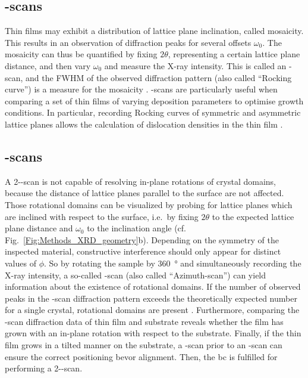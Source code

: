 \subsection{\textomega-scans}
    \label{Sec:Methods_omegaScan}
Thin films may exhibit a distribution of lattice plane inclination, called mosaicity.
This results in an observation of diffraction peaks for several offsets $\omega_0$.
The mosaicity can thus be quantified by fixing $2\theta$, representing a certain lattice plane distance, and then vary $\omega_0$ and measure the X-ray intensity.
This is called an \textomega-scan, and the \gls{FWHM} of the observed diffraction pattern (also called \enquote{Rocking curve}) is a measure for the mosaicity
    \cite{harrington2021}.
\textomega-scans are particularly useful when comparing a set of thin films of varying deposition parameters to optimise growth conditions.
In particular, recording Rocking curves of symmetric and asymmetric lattice planes allows the calculation of dislocation densities in the thin film
    \cite{srikant1997}.
\subsection{\textphi-scans}
A 2\texttheta-\textomega-scan is not capable of resolving in-plane rotations of crystal domains, because the distance of lattice planes parallel to the surface are not affected.
Those rotational domains can be visualized by probing for lattice planes which are inclined with respect to the surface, i.e.\ by fixing $2\theta$ to the expected lattice plane distance and $\omega_0$ to the inclination angle (cf. Fig.~\ref{Fig:Methods_XRD_geometry}b).
Depending on the symmetry of the inspected material, constructive interference should only appear for distinct values of $\phi$.
So by rotating the sample by \qty{360}{\degree} and simultaneously recording the X-ray intensity, a so-called \textphi-scan (also called \enquote{Azimuth-scan}) can yield information about the existence of rotational domains.
If the number of observed peaks in the \textphi-scan diffraction pattern exceeds the theoretically expected number for a single crystal, rotational domains are present
    \cite{harrington2021}.
Furthermore, comparing the \textphi-scan diffraction data of thin film and substrate reveals whether the film has grown with an in-plane rotation with respect to the substrate.
Finally, if the thin film grows in a tilted manner on the substrate, a \textphi-scan prior to an \textomega-scan can ensure the correct positioning bevor alignment.
Then, the \gls{bc} is fulfilled for performing a 2\texttheta-\textomega-scan.

